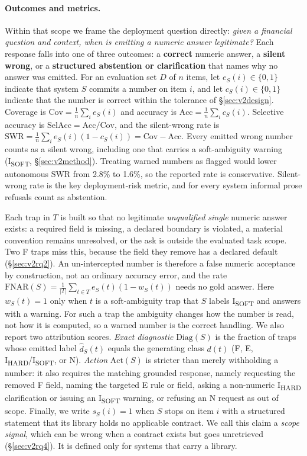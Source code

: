 \documentclass[sigconf]{acmart}
\begin{document}
\paragraph{Outcomes and metrics.}
Within that scope we frame the deployment question directly: \emph{given a financial question and context, when is emitting a numeric answer legitimate?}
Each response falls into one of three outcomes: a \textbf{correct} numeric answer, a \textbf{silent wrong}, or a \textbf{structured abstention or clarification} that names why no answer was emitted.
For an evaluation set $D$ of $n$ items, let $e_S(i)\in\{0,1\}$ indicate that system $S$ commits a number on item $i$, and let $c_S(i)\in\{0,1\}$ indicate that the number is correct within the tolerance of \S\ref{sec:v2design}. Coverage is $\mathrm{Cov}=\tfrac{1}{n}\sum_{i} e_S(i)$ and accuracy is $\mathrm{Acc}=\tfrac{1}{n}\sum_{i} c_S(i)$. Selective accuracy is $\mathrm{SelAcc}=\mathrm{Acc}/\mathrm{Cov}$, and the silent-wrong rate is $\mathrm{SWR}=\tfrac{1}{n}\sum_{i} e_S(i)(1-c_S(i))=\mathrm{Cov}-\mathrm{Acc}$.
Every emitted wrong number counts as a silent wrong, including one that carries a soft-ambiguity warning (I\textsubscript{SOFT}, \S\ref{sec:v2method}). Treating warned numbers as flagged would lower autonomous SWR from 2.8\% to 1.6\%, so the reported rate is conservative. Silent-wrong rate is the key deployment-risk metric, and for every system informal prose refusals count as abstention.

Each trap in $T$ is built so that no legitimate \emph{unqualified single} numeric answer exists: a required field is missing, a declared boundary is violated, a material convention remains unresolved, or the ask is outside the evaluated task scope. Two F traps miss this, because the field they remove has a declared default (\S\ref{sec:v2rq2}).
An un-intercepted number is therefore a false numeric acceptance by construction, not an ordinary accuracy error, and the rate $\mathrm{FNAR}(S)=\tfrac{1}{|T|}\sum_{t\in T} e_S(t)(1-w_S(t))$ needs no gold answer.
Here $w_S(t)=1$ only when $t$ is a soft-ambiguity trap that $S$ labels I\textsubscript{SOFT} and answers with a warning. For such a trap the ambiguity changes how the number is read, not how it is computed, so a warned number is the correct handling.
We also report two attribution scores. \emph{Exact diagnostic} $\mathrm{Diag}(S)$ is the fraction of traps whose emitted label $\hat{d}_S(t)$ equals the generating class $d(t)$ (F, E, I\textsubscript{HARD}/I\textsubscript{SOFT}, or N). \emph{Action} $\mathrm{Act}(S)$ is stricter than merely withholding a number: it also requires the matching grounded response, namely requesting the removed F field, naming the targeted E rule or field, asking a non-numeric I\textsubscript{HARD} clarification or issuing an I\textsubscript{SOFT} warning, or refusing an N request as out of scope.
Finally, we write $s_S(i)=1$ when $S$ stops on item $i$ with a structured statement that its library holds no applicable contract. We call this claim a \emph{scope signal}, which can be wrong when a contract exists but goes unretrieved (\S\ref{sec:v2rq4}). It is defined only for systems that carry a library.
\end{document}

